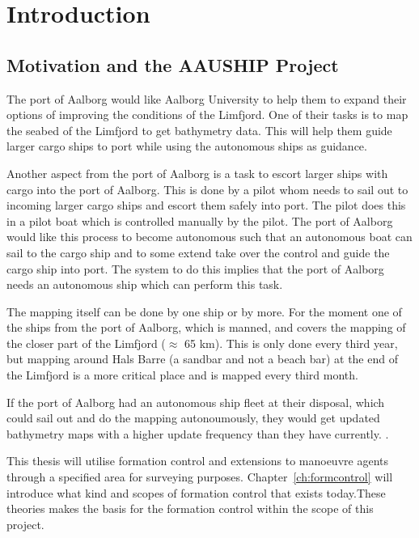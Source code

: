 \chapter{Introduction}

\section{Motivation and the AAUSHIP Project}
The port of Aalborg would like Aalborg University to help them to expand their options of improving the conditions of the Limfjord. One of their tasks is to map the seabed of the Limfjord to get bathymetry data. This will help them guide larger cargo ships to port while using the autonomous ships as guidance.

Another aspect from the port of Aalborg is a task to escort larger ships with cargo into the port of Aalborg. This is done by a pilot whom needs to sail out to incoming larger cargo ships and escort them safely into port. The pilot does this in a pilot boat which is controlled manually by the pilot. The port of Aalborg would like this process to become autonomous such that an autonomous boat can sail to the cargo ship and to some extend take over the control and guide the cargo ship into port. The system to do this implies that the port of Aalborg needs an autonomous ship which can perform this task.

The mapping itself can be done by one ship or by more. For the moment one of the ships from the port of Aalborg, which is manned, and covers the mapping of the closer part of the Limfjord ($\approx$ 65 km). This is only done every third year, but mapping around Hals Barre (a sandbar and not a beach bar) at the end of the Limfjord is a more critical place and is mapped every third month.

If the port of Aalborg had an autonomous ship fleet at their disposal, which could sail out and do the mapping autonoumously, they would get updated bathymetry maps with a higher update frequency than they have currently.  \cite{portofaalborg}.

This thesis will utilise formation control and extensions to manoeuvre agents through a specified area for surveying purposes. Chapter~\vref{ch:formcontrol} will introduce what kind and scopes of formation control that exists today.These theories makes the basis for the formation control within the scope of this project.


